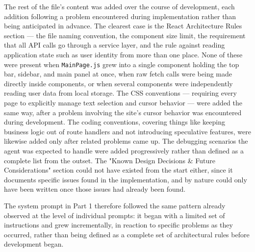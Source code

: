 The rest of the file's content was added over the course of development, each addition following a problem encountered during implementation rather than being anticipated in advance. The clearest case is the React Architecture Rules section --- the file naming convention, the component size limit, the requirement that all API calls go through a service layer, and the rule against reading application state such as user identity from more than one place. None of these were present when \texttt{MainPage.js} grew into a single component holding the top bar, sidebar, and main panel at once, when raw fetch calls were being made directly inside components, or when several components were independently reading user data from local storage. The CSS conventions --- requiring every page to explicitly manage text selection and cursor behavior --- were added the same way, after a problem involving the site's cursor behavior was encountered during development. The coding conventions, covering things like keeping business logic out of route handlers and not introducing speculative features, were likewise added only after related problems came up. The debugging scenarios the agent was expected to handle were added progressively rather than defined as a complete list from the outset. The "Known Design Decisions \& Future Considerations" section could not have existed from the start either, since it documents specific issues found in the implementation, and by nature could only have been written once those issues had already been found.

The system prompt in Part 1 therefore followed the same pattern already observed at the level of individual prompts: it began with a limited set of instructions and grew incrementally, in reaction to specific problems as they occurred, rather than being defined as a complete set of architectural rules before development began.

